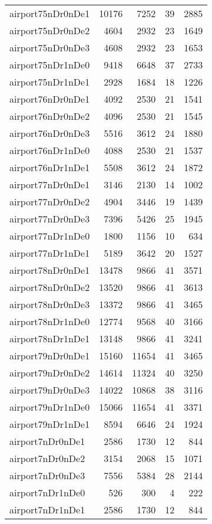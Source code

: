 \begin{longtable}{lrrrr}
airport75nDr0nDe1 & 10176 & 7252 & 39 & 2885 \\
airport75nDr0nDe2 & 4604 & 2932 & 23 & 1649 \\
airport75nDr0nDe3 & 4608 & 2932 & 23 & 1653 \\
airport75nDr1nDe0 & 9418 & 6648 & 37 & 2733 \\
airport75nDr1nDe1 & 2928 & 1684 & 18 & 1226 \\
airport76nDr0nDe1 & 4092 & 2530 & 21 & 1541 \\
airport76nDr0nDe2 & 4096 & 2530 & 21 & 1545 \\
airport76nDr0nDe3 & 5516 & 3612 & 24 & 1880 \\
airport76nDr1nDe0 & 4088 & 2530 & 21 & 1537 \\
airport76nDr1nDe1 & 5508 & 3612 & 24 & 1872 \\
airport77nDr0nDe1 & 3146 & 2130 & 14 & 1002 \\
airport77nDr0nDe2 & 4904 & 3446 & 19 & 1439 \\
airport77nDr0nDe3 & 7396 & 5426 & 25 & 1945 \\
airport77nDr1nDe0 & 1800 & 1156 & 10 & 634 \\
airport77nDr1nDe1 & 5189 & 3642 & 20 & 1527 \\
airport78nDr0nDe1 & 13478 & 9866 & 41 & 3571 \\
airport78nDr0nDe2 & 13520 & 9866 & 41 & 3613 \\
airport78nDr0nDe3 & 13372 & 9866 & 41 & 3465 \\
airport78nDr1nDe0 & 12774 & 9568 & 40 & 3166 \\
airport78nDr1nDe1 & 13148 & 9866 & 41 & 3241 \\
airport79nDr0nDe1 & 15160 & 11654 & 41 & 3465 \\
airport79nDr0nDe2 & 14614 & 11324 & 40 & 3250 \\
airport79nDr0nDe3 & 14022 & 10868 & 38 & 3116 \\
airport79nDr1nDe0 & 15066 & 11654 & 41 & 3371 \\
airport79nDr1nDe1 & 8594 & 6646 & 24 & 1924 \\
airport7nDr0nDe1 & 2586 & 1730 & 12 & 844 \\
airport7nDr0nDe2 & 3154 & 2068 & 15 & 1071 \\
airport7nDr0nDe3 & 7556 & 5384 & 28 & 2144 \\
airport7nDr1nDe0 & 526 & 300 & 4 & 222 \\
airport7nDr1nDe1 & 2586 & 1730 & 12 & 844 \\

\end{longtable}

